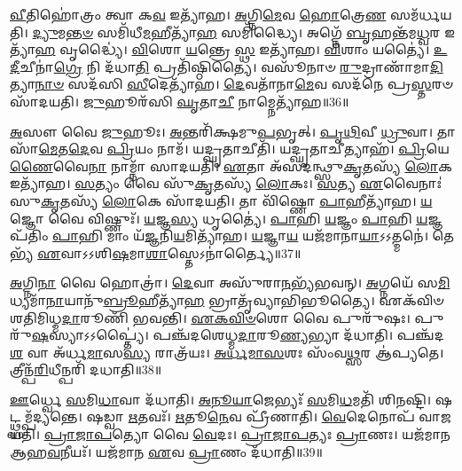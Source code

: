 \-\ul{𑌵𑍀}\-𑌤𑌿𑌹𑍋॑𑌤𑍍𑌰𑌂 𑌤𑍍𑌵𑌾 𑌕\-\ul{𑌵} 𑌇𑌤𑍍𑌯𑌾᳴𑌹।
\-\ul{𑌅}\-𑌗𑍍𑌨𑌿\-\ul{𑌮𑍇}\-𑌵 \ul{𑌹𑍋}\-𑌤𑍍𑌰𑍇\-\ul{𑌣} 𑌸𑌮᳴𑌰𑍍𑌧𑌯𑌤𑌿।
\-\ul{𑌦𑍍𑌯𑍁}\-𑌮\-\ul{𑌨𑍍𑌤}\-\-\ul{𑍞} 𑌸𑌮𑌿᳴𑌧𑍀\-\ul{𑌮}\-𑌹𑍀𑌤𑍍𑌯𑌾᳴\-\ul{𑌹} 𑌸𑌮𑌿᳴𑌦𑍍𑌧𑍍𑌯𑍈।
𑌅𑌗𑍍𑌨𑍇᳴ \ul{𑌬𑍃}\-𑌹𑌨𑍍𑌤᳴𑌮\-\ul{𑌧𑍍𑌵}\-𑌰 𑌇𑌤𑍍𑌯𑌾᳴\-\ul{𑌹} 𑌵𑍃𑌦𑍍𑌧𑍍𑌯𑍈॑।
\-\ul{𑌵𑌿}\-𑌶𑍋 \ul{𑌯}\-𑌨𑍍𑌤𑍍𑌰𑍇 \ul{𑌸𑍍𑌥} 𑌇𑌤𑍍𑌯𑌾᳴𑌹।
\-\ul{𑌵𑌿}\-𑌶𑌾𑌂 𑌯𑌤𑍍𑌯𑍈॑।
\-\ul{𑌉}\-\-\ul{𑌦𑍀}\-𑌚𑍀𑌨𑌾॑\-\ul{𑌗𑍍𑌰𑍇} 𑌨𑌿 𑌦᳴𑌧𑌾\-\ul{𑌤𑌿} 𑌪𑍍𑌰𑌤𑌿᳴\-𑌷𑍍𑌠𑌿𑌤𑍍𑌯𑍈।
𑌵𑌸𑍂᳴𑌨𑌾𑍞 \ul{𑌰𑍁}\-𑌦𑍍𑌰𑌾𑌣𑌾᳴𑌮𑌾\-\ul{𑌦𑌿}\-𑌤𑍍𑌯𑌾\-\ul{𑌨𑌾}\-\-\ul{𑍞} 𑌸𑌦᳴𑌸𑌿 \ul{𑌸𑍀}\-𑌦𑍇𑌤𑍍𑌯𑌾᳴𑌹।
\-\ul{𑌦𑍇}\-𑌵𑌤𑌾᳴𑌨𑌾\-\ul{𑌮𑍇}\-𑌵 𑌸𑌦᳴𑌨𑍇 𑌪𑍍𑌰\-\ul{𑌸𑍍𑌤}\-𑌰𑍞 𑌸𑌾᳴𑌦𑌯𑌤𑌿।
\-\ul{𑌜𑍁}\-𑌹𑍂𑌰᳴𑌸𑌿 \ul{𑌘𑍃}\-𑌤𑌾\-\ul{𑌚𑍀} 𑌨𑌾𑌮𑍍𑌨𑍇𑌤𑍍𑌯𑌾᳴𑌹॥36॥

\-\ul{𑌅}\-𑌸𑍗 𑌵𑍈 \ul{𑌜𑍁}\-𑌹𑍂𑌃।
\-\ul{𑌅}\-𑌨𑍍𑌤𑌰𑌿᳴𑌕𑍍𑌷𑌮𑍁\-\ul{𑌪}\-𑌭𑍃𑌤𑍍।
\-\ul{𑌪𑍃}\-\-\ul{𑌥𑌿}\-𑌵𑍀 \ul{𑌧𑍍𑌰𑍁}\-𑌵𑌾।
𑌤𑌾𑌸𑌾᳴\-\ul{𑌮𑍇}\-𑌤\-\ul{𑌦𑍇}\-𑌵 \ul{𑌪𑍍𑌰𑌿}\-𑌯𑌂 𑌨𑌾𑌮᳴।
𑌯𑌦𑍍\mbox{}\-\ul{𑌘𑍃}\-𑌤𑌾𑌚𑍀𑌤𑌿᳴।
𑌯𑌦𑍍\mbox{}\-\ul{𑌘𑍃}\-𑌤𑌾𑌚𑍀𑌤𑍍𑌯𑌾𑌹᳴।
\-\ul{𑌪𑍍𑌰𑌿}\-𑌯𑍇\-\ul{𑌣𑍈}\-𑌵𑍈\-\ul{𑌨𑌾} 𑌨𑌾𑌮𑍍𑌨𑌾᳴ 𑌸𑌾𑌦𑌯𑌤𑌿।
\-\ul{𑌏}\-𑌤𑌾 𑌅᳴𑌸𑌦𑌨𑍍𑌥𑍍𑌸𑍁\-\ul{𑌕𑍃}\-𑌤𑌸𑍍𑌯᳴ \ul{𑌲𑍋}\-𑌕 𑌇𑌤𑍍𑌯𑌾᳴𑌹।
\-\ul{𑌸}\-𑌤𑍍𑌯𑌂 𑌵𑍈 𑌸𑍁᳴\-\ul{𑌕𑍃}\-𑌤𑌸𑍍𑌯᳴ \ul{𑌲𑍋}\-𑌕𑌃।
\-\ul{𑌸}\-𑌤𑍍𑌯 \ul{𑌏}\-𑌵𑍈𑌨𑌾𑌃॑ 𑌸𑍁\-\ul{𑌕𑍃}\-𑌤𑌸𑍍𑌯᳴ \ul{𑌲𑍋}\-𑌕𑍇 𑌸𑌾᳴𑌦𑌯𑌤𑌿।
𑌤𑌾 𑌵𑌿᳴𑌷𑍍𑌣𑍋 \ul{𑌪𑌾}\-𑌹𑍀𑌤𑍍𑌯𑌾᳴𑌹।
\-\ul{𑌯}\-𑌜𑍍𑌞𑍋 𑌵𑍈 𑌵𑌿𑌷𑍍𑌣𑍁𑌃᳴।
\-\ul{𑌯}\-𑌜𑍍𑌞\-\ul{𑌸𑍍𑌯} 𑌧𑍃𑌤𑍍𑌯𑍈॑।
\-\ul{𑌪𑌾}\-𑌹𑌿 \ul{𑌯}\-𑌜𑍍𑌞𑌂 \ul{𑌪𑌾}\-𑌹𑌿 \ul{𑌯}\-𑌜𑍍𑌞𑌪᳴𑌤𑌿𑌂 \ul{𑌪𑌾}\-𑌹𑌿 𑌮𑌾𑌂 𑌯᳴\-\ul{𑌜𑍍𑌞}\-𑌨𑌿\-\ul{𑌯}\-𑌮𑌿𑌤𑍍𑌯𑌾᳴𑌹।
\-\ul{𑌯}\-𑌜𑍍𑌞𑌾\-\ul{𑌯} 𑌯𑌜᳴𑌮𑌾𑌨𑌾\-\ul{𑌯𑌾}\-𑌽𑌽𑌤𑍍𑌮𑌨𑍇॑।
𑌤𑍇𑌭𑍍𑌯᳴ \ul{𑌏}\-𑌵𑌾𑌽𑌽𑌶𑌿\-\ul{𑌷}\-𑌮𑌾\-\ul{𑌶𑌾}\-𑌸𑍍𑌤𑍇\-𑌽𑌨𑌾॑𑌰𑍍𑌤𑍍𑌯𑍈॥37॥\anuvakamend[𑌸𑍍𑌥𑍇𑌤𑍍𑌯𑌾᳴𑌹 𑌪𑍃\-\ul{𑌥𑌿}\-𑌵𑍀 𑌵𑍇\-\ul{𑌦𑌿}\-𑌰𑍍𑌯𑌨𑍍𑌤𑌿᳴ \ul{𑌕𑍍𑌰𑌿}\-𑌯\-\ul{𑌤𑍇} 𑌵𑍀𑌣𑍁᳴\-\ul{𑌰𑍍𑌵𑍀}\-𑌰𑍍𑌯᳴𑌸𑌮𑍍𑌮𑌿𑌤𑌂 𑌕𑌰𑍋𑌤𑍍𑌯𑌾𑌹 𑌪𑌾\-\ul{𑌤𑌿} 𑌨𑌾𑌮𑍍𑌨𑍇𑌤𑍍𑌯𑌾᳴𑌹 \ul{𑌲𑍋}\-𑌕𑍇 𑌸𑌾᳴𑌦𑌯\-\ul{𑌤𑌿} 𑌷𑌟𑍍 𑌚᳴]

\-\ul{𑌅}\-𑌗𑍍𑌨𑌿\-\ul{𑌨𑌾} 𑌵𑍈 𑌹𑍋𑌤𑍍𑌰𑌾॑।
\-\ul{𑌦𑍇}\-𑌵𑌾 𑌅𑌸𑍁᳴𑌰𑌾\-\ul{𑌨}\-𑌭𑍍𑌯᳴𑌭𑌵𑌨𑍍।
\-\ul{𑌅}\-𑌗𑍍𑌨𑌯𑍇᳴ 𑌸\-\ul{𑌮𑌿}\-𑌧𑍍𑌯𑌮𑌾᳴\-\ul{𑌨𑌾}\-𑌯𑌾𑌨𑍁᳴\-\ul{𑌬𑍍𑌰𑍂}\-𑌹𑍀𑌤𑍍𑌯𑌾᳴\-\ul{𑌹} 𑌭𑍍𑌰𑌾𑌤𑍃᳴𑌵𑍍𑌯𑌾𑌭𑌿𑌭𑍂𑌤𑍍𑌯𑍈।
𑌏𑌕᳴𑌵𑌿𑍞𑌶𑌤𑌿\-𑌮𑌿𑌧𑍍𑌮\-\ul{𑌦𑌾}\-𑌰𑍂𑌣𑌿᳴ 𑌭𑌵𑌨𑍍𑌤𑌿।
\-\ul{𑌏}\-\-\ul{𑌕}\-\-\ul{𑌵𑌿}\-\-\ul{𑍞}\-𑌶𑍋 𑌵𑍈 𑌪𑍁𑌰𑍁᳴𑌷𑌃।
𑌪𑍁𑌰𑍁᳴\-\ul{𑌷}\-𑌸𑍍𑌯𑌾𑌽𑌽𑌪𑍍𑌤𑍍𑌯𑍈॑।
𑌪𑌞𑍍𑌚᳴𑌦𑌶𑍇𑌧𑍍𑌮\-\-\ul{𑌦𑌾}\-𑌰𑍂\-\ul{𑌣𑍍𑌯}\-𑌭𑍍𑌯𑌾 𑌦᳴𑌧𑌾𑌤𑌿।
𑌪𑌞𑍍𑌚᳴𑌦\-\ul{𑌶} 𑌵𑌾 𑌅᳴𑌰𑍍𑌧\-\ul{𑌮𑌾}\-𑌸\-\ul{𑌸𑍍𑌯} 𑌰𑌾𑌤𑍍𑌰᳴𑌯𑌃।
\-\ul{𑌅}\-\-\ul{𑌰𑍍𑌧}\-\-\ul{𑌮𑌾}\-\-\ul{𑌸}\-𑌶𑌃 𑌸𑌂᳴𑌵\-\ul{𑌥𑍍𑌸}\-𑌰 𑌆॑𑌪𑍍𑌯𑌤𑍇।
𑌤𑍍𑌰𑍀𑌨𑍍𑌪᳴\-\ul{𑌰𑌿}\-𑌧𑍀𑌨𑍍𑌪𑌰𑌿᳴ 𑌦𑌧𑌾𑌤𑌿॥38॥

\-\ul{𑌊}\-𑌰𑍍𑌧𑍍𑌵𑍇 \ul{𑌸}\-𑌮𑌿\-\ul{𑌧𑌾}\-𑌵𑌾 𑌦᳴𑌧𑌾𑌤𑌿।
\-\ul{𑌅}\-\-\ul{𑌨𑍂}\-\-\ul{𑌯𑌾}\-𑌜𑍇𑌭𑍍𑌯𑌃᳴ \ul{𑌸}\-𑌮𑌿\-\ul{𑌧}\-𑌮𑌤𑌿᳴ 𑌶𑌿𑌨𑌷𑍍𑌟𑌿।
𑌷𑌟𑍍𑌥𑍍𑌸𑌮𑍍𑌪᳴𑌦𑍍𑌯𑌨𑍍𑌤𑍇।
𑌷𑌡𑍍𑌵𑌾 \ul{𑌋}\-𑌤𑌵𑌃᳴।
\-\ul{𑌋}\-𑌤𑍂\-\ul{𑌨𑍇}\-𑌵 𑌪𑍍𑌰𑍀᳴𑌣𑌾𑌤𑌿।
\-\ul{𑌵𑍇}\-𑌦𑍇𑌨𑍋𑌪᳴ 𑌵𑌾𑌜𑌯𑌤𑌿।
\-\ul{𑌪𑍍𑌰𑌾}\-\-\ul{𑌜𑌾}\-\-\ul{𑌪}\-𑌤𑍍𑌯𑍋 𑌵𑍈 \ul{𑌵𑍇}\-𑌦𑌃।
\-\ul{𑌪𑍍𑌰𑌾}\-\-\ul{𑌜𑌾}\-\-\ul{𑌪}\-𑌤𑍍𑌯𑌃 \ul{𑌪𑍍𑌰𑌾}\-𑌣𑌃।
𑌯𑌜᳴𑌮𑌾𑌨 𑌆𑌹\-\ul{𑌵}\-𑌨𑍀𑌯𑌃᳴।
𑌯𑌜᳴𑌮𑌾𑌨 \ul{𑌏}\-𑌵 \ul{𑌪𑍍𑌰𑌾}\-𑌣𑌂 𑌦᳴𑌧𑌾𑌤𑌿॥39॥

